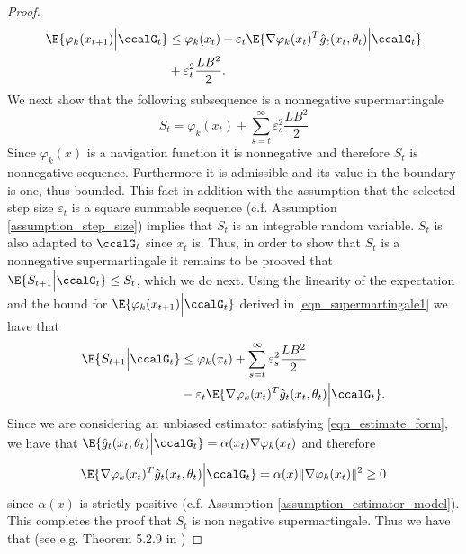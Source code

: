 \documentclass[article]{IEEEtran}
\theoremstyle{definition}
\begin{document}
\begin{proof}
\begin{equation}\label{eqn_supermartingale1}
\begin{split}
\E{\varphi_k(x_{t+1})\Big| \ccalG_t} &\leq \varphi_k(x_t) - \varepsilon_t  \E{\nabla \varphi_k(x_t)^T\hat{g}_t(x_t,\theta_t)\Big| \ccalG_t} \\
&+\varepsilon_t^2\frac{LB^2}{2}.
\end{split}
\end{equation}
%
We next show that the following subsequence is a nonnegative supermartingale
%
\begin{equation}\label{eqn_supermartingale}
S_t= \varphi_k(x_{t}) +\sum_{s=t}^\infty \varepsilon_s^2 \frac{LB^2}{2}
\end{equation}
%
Since $\varphi_k(x)$ is a navigation function it is nonnegative and therefore $S_t$ is nonnegative sequence. Furthermore it is admissible and its value in the boundary is one, thus bounded. This fact in addition with the assumption that the selected step size $\varepsilon_t$ is a square summable sequence (c.f. Assumption \ref{assumption_step_size}) implies that $S_t$ is an integrable random variable. $S_t$ is also adapted to $\ccalG_t$ since $x_t$ is.  Thus, in order to show that $S_t$ is a nonnegative supermartingale it remains to be prooved that $\E{S_{t+1}\Big|\ccalG_t} \leq S_t$, which we do next. Using the linearity of the expectation and the bound for $\E{\varphi_k(x_{t+1})\Big| \ccalG_t} $ derived in \eqref{eqn_supermartingale1} we have that
%
\begin{equation}\label{eqn_half_supermartingale}
\begin{split}
\E{S_{t+1}\Big| \ccalG_t} &\leq \varphi_k(x_t)  +\sum_{s=t}^\infty \varepsilon_s^2\frac{LB^2}{2} \\
&-\varepsilon_t  \E{\nabla \varphi_k(x_t)^T\hat{g}_t(x_t,\theta_t)\Big| \ccalG_t}.
\end{split}
\end{equation}
%
Since we are considering an unbiased estimator satisfying \eqref{eqn_estimate_form}, we have that $\E{\hat{g}_t(x_t,\theta_t)\Big|\ccalG_t}=\alpha(x_t) \nabla \varphi_k(x_t)$ and therefore 
%
\begin{equation}
\E{\nabla \varphi_k(x_t)^T\hat{g}_t(x_t,\theta_t)\Big| \ccalG_t} = \alpha(x)\|\nabla \varphi_k(x_t)\|^2\geq 0
\end{equation}
%
since $\alpha(x)$ is strictly positive (c.f. Assumption \ref{assumption_estimator_model}). This completes the proof that $S_t$ is non negative supermartingale. Thus we have that (see e.g. Theorem 5.2.9 in \cite{durrett2010probability})%

\end{proof}
\end{document}
